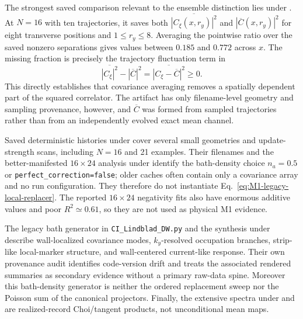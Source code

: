 \documentclass[aps,prx,twocolumn,floatfix,nofootinbib,superscriptaddress,longbibliography]{revtex4-2}
\newcommand{\code}[1]{\texttt{#1}}
\begin{document}
The strongest saved comparison relevant to the ensemble distinction lies under
.  At $N=16$ with ten trajectories, it saves both
$\overline{|C_\xi(x,r_y)|^2}$ and $|\overline C(x,r_y)|^2$ for eight transverse positions
and $1\leq r_y\leq8$.  Averaging the pointwise ratio over the saved nonzero separations
gives values between $0.185$ and $0.772$ across $x$.  The missing fraction is precisely the
trajectory fluctuation term in
\begin{equation}
 \overline{|C_\xi|^2}-|\overline C|^2
 =\overline{|C_\xi-\overline C|^2}\geq0.
 \label{eq:M1-legacy-correlation-variance}
\end{equation}
This directly establishes that covariance averaging removes a spatially dependent part of
the squared correlator.  The artifact has only filename-level geometry and sampling
provenance, however, and $\overline C$ was formed from sampled trajectories rather than
from an independently evolved exact mean channel.

Saved deterministic histories under  cover several small
geometries and update-strength scans, including $N=16$ and 21 examples.  Their filenames
and the better-manifested $16\times24$ analysis under
 identify the bath-density choice $n_a=0.5$ or
\code{perfect\_correction=false}; older caches often contain only a covariance array and no
run configuration.  They therefore do not instantiate
Eq.~\eqref{eq:M1-legacy-local-replacer}.  The reported $16\times24$ negativity fits also
have enormous additive values and poor $R^2\simeq0.61$, so they are not used as physical
M1 evidence.

The legacy bath generator in \code{CI\_Lindblad\_DW.py} and the synthesis under
 describe wall-localized covariance modes,
$k_y$-resolved occupation branches, strip-like local-marker structure, and wall-centered
current-like response.  Their own provenance audit identifies code-version drift and
treats the associated rendered summaries as secondary evidence without a primary raw-data
spine.  Moreover this bath-density generator is neither the ordered replacement sweep nor
the Poisson sum of the canonical projectors.  Finally, the extensive spectra under
 and
 are realized-record Choi/tangent products,
not unconditional mean maps.
\end{document}
